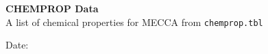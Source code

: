 \documentclass[a4paper]{article}
\begin{document}
\thispagestyle{empty}
\begin{center}

  \vspace*{30mm}
  {\Huge\bf CHEMPROP Data}\\[15mm]
  {\LARGE A list of chemical properties for MECCA from \verb|chemprop.tbl|}\\[3mm]

  \vfill

  {\Large Date: \myfiledate}

\end{center}

\clearpage
\end{document}
